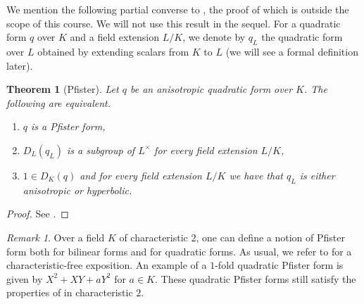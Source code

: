 \documentclass[12pt, leqno, british]{amsart}
\theoremstyle{definition}
\theoremstyle{plain}
\newtheorem{thm}[defi]{Theorem}
\theoremstyle{remark}
\newtheorem{rem}[defi]{Remark}
\begin{document}
We mention the following partial converse to , the proof of which is outside the scope of this course.
We will not use this result in the sequel.
For a quadratic form $q$ over $K$ and a field extension $L/K$, we denote by $q_L$ the quadratic form over $L$ obtained by extending scalars from $K$ to $L$ (we will see a formal definition later).
\begin{thm}[Pfister]\label{T:Pfister-characterisation}
Let $q$ be an anisotropic quadratic form over $K$.
The following are equivalent.
\begin{enumerate}
\item $q$ is a Pfister form,
\item $D_L(q_L)$ is a subgroup of $L^\times$ for every field extension $L/K$,
\item $1 \in D_K(q)$ and for every field extension $L/K$ we have that $q_L$ is either anisotropic or hyperbolic.
\end{enumerate}
\end{thm}
\begin{proof}
See \autocite[Theorem 23.2 and Corollary 23.4]{ElmanKarpenkoMerkurjev}.
\end{proof}
\begin{rem}
Over a field $K$ of characteristic $2$, one can define a notion of Pfister form both for bilinear forms and for quadratic forms.
As usual, we refer to \autocite[Sections 7 and 9]{ElmanKarpenkoMerkurjev} for a characteristic-free exposition.
An example of a $1$-fold quadratic Pfister form is given by $X^2 + XY + aY^2$ for $a \in K$.
These quadratic Pfister forms still satisfy the properties of  in characteristic $2$.
\end{rem}
\end{document}
